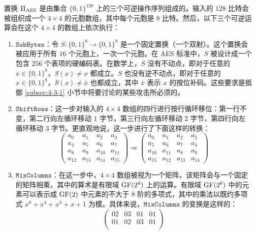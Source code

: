 \begin{snote}
置换 $\Pi_{\rm AES}$ 是由集合 $\{0,1\}^{128}$ 上的三个可逆操作序列组成的。输入的 $128$ 比特会被组织成一个 $4\times4$ 的元胞数组，其中每个元胞是 $8$ 比特。然后，以下三个可逆运算会在这个 $4\times4$ 的数组上依次执行：
\begin{enumerate}
	\item $\mathtt{SubBytes}$：令 $S:\{0,1\}^8\to\{0,1\}^8$ 是一个固定置换（一个双射）。这个置换会被应用于所有 $16$ 个元胞上，一次一个元胞。在 AES 标准中，$S$ 被设计成一个包含 $256$ 个表项的硬编码表。在数学上，$S$ 没有不动点，即对于任意的 $x\in\{0,1\}^8$，$S(x)\neq x$ 都成立。$S$ 也没有逆不动点，即对于任意的 $x\in\{0,1\}^8$，$S(x)\neq \bar x$ 也都成立，其中 $\bar x$ 表示 $x$ 的按位补码。这些要求是抵御 \ref{subsec:4-3-1} 小节中将要讨论的某些攻击所必须的。
	\item $\mathtt{ShiftRows}$：这一步对输入的 $4\times4$ 数组的四行进行按行循环移位：第一行不变，第二行向左循环移动 $1$ 字节，第三行向左循环移动 $2$ 字节，第四行向左循环移动 $3$ 字节。更直观地说，这一步进行了下面这样的转换：
	\begin{equation}\label{eq:4-11}
    \begin{pmatrix}
       a_0 & a_1 & a_2 & a_3\\
       a_4 & a_5 & a_6 & a_7\\
       a_8 & a_9 & a_{10} & a_{11}\\
       a_{12} & a_{13} & a_{14} & a_{15}
    \end{pmatrix}
    \Longrightarrow
    \begin{pmatrix}
       a_0 & a_1 & a_2 & a_3\\
       a_5 & a_6 & a_7 & a_4\\
       a_{10} & a_{11} & a_{8} & a_{9}\\
       a_{15} & a_{12} & a_{13} & a_{14}
    \end{pmatrix}
    \end{equation}
    \item $\mathtt{MixColumns}$：在这一步中，$4\times4$ 数组被视为一个矩阵，该矩阵会与一个固定的矩阵相乘，其中的算术是有限域 ${\rm GF}(2^8)$ 上的运算。有限域 ${\rm GF}(2^8)$ 中的元素可以表示成 ${\rm GF}(2)$ 中元素的不大于 $8$ 阶的多项式，其中的乘法以既约多项式 $x^8+x^4+x^3+x+1$ 为模。具体来说，$\mathtt{MixColumns}$ 的变换是这样的：
    \begin{equation}\label{eq:4-12}
    	\begin{pmatrix}	
    		02 & 03 & 01 & 01\\
    		01 & 02 & 03 & 01\\

\end{pmatrix}
\end{equation}
\end{enumerate}
\end{snote}
